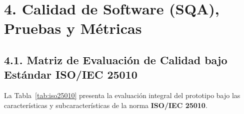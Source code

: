 \documentclass[12pt,letterpaper]{report}
\begin{document}
\newpage
\section*{4. Calidad de Software (SQA), Pruebas y Métricas}

\subsection*{4.1. Matriz de Evaluación de Calidad bajo Estándar ISO/IEC 25010}

La Tabla~\ref{tab:iso25010} presenta la evaluación integral del prototipo bajo las características y subcaracterísticas de la norma \textbf{ISO/IEC 25010}.
\end{document}
